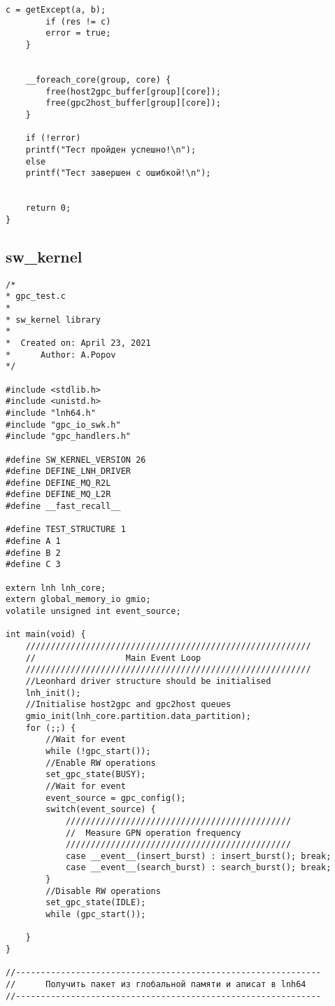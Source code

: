 \begin{lstlisting}[label=lst:host,caption=Измененный код хост-системы под индивидульное задание]
		c = getExcept(a, b);
		if (res != c)
		error = true;
	}
	
	
	__foreach_core(group, core) {
		free(host2gpc_buffer[group][core]);
		free(gpc2host_buffer[group][core]);
	}
	
	if (!error)
	printf("Тест пройден успешно!\n");
	else
	printf("Тест завершен с ошибкой!\n");
	
	
	return 0;
}
\end{lstlisting}

\subsection{sw\_kernel}

\begin{lstlisting}[label=lst:swkernel,caption=Измененный код sw\_kernel под индивидульное задание]
/*
* gpc_test.c
*
* sw_kernel library
*
*  Created on: April 23, 2021
*      Author: A.Popov
*/

#include <stdlib.h>
#include <unistd.h>
#include "lnh64.h"
#include "gpc_io_swk.h"
#include "gpc_handlers.h"

#define SW_KERNEL_VERSION 26
#define DEFINE_LNH_DRIVER
#define DEFINE_MQ_R2L
#define DEFINE_MQ_L2R
#define __fast_recall__

#define TEST_STRUCTURE 1
#define A 1
#define B 2
#define C 3

extern lnh lnh_core;
extern global_memory_io gmio;
volatile unsigned int event_source;

int main(void) {
	/////////////////////////////////////////////////////////
	//                  Main Event Loop
	/////////////////////////////////////////////////////////
	//Leonhard driver structure should be initialised
	lnh_init();
	//Initialise host2gpc and gpc2host queues
	gmio_init(lnh_core.partition.data_partition);
	for (;;) {
		//Wait for event
		while (!gpc_start());
		//Enable RW operations
		set_gpc_state(BUSY);
		//Wait for event
		event_source = gpc_config();
		switch(event_source) {
			/////////////////////////////////////////////
			//  Measure GPN operation frequency
			/////////////////////////////////////////////
			case __event__(insert_burst) : insert_burst(); break;
			case __event__(search_burst) : search_burst(); break;
		}
		//Disable RW operations
		set_gpc_state(IDLE);
		while (gpc_start());
		
	}
}

//-------------------------------------------------------------
//      Получить пакет из глобальной памяти и аписат в lnh64
//-------------------------------------------------------------


\end{lstlisting}
